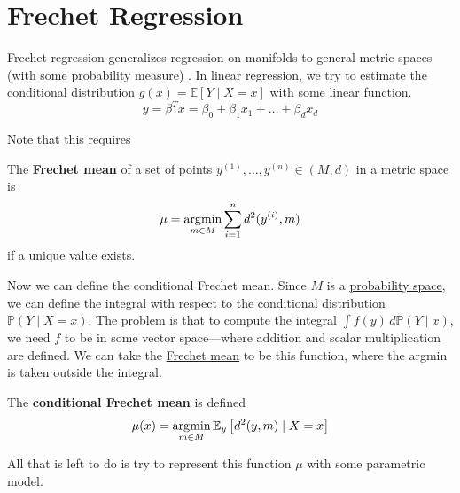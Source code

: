 \section{Frechet Regression} 

  Frechet regression generalizes regression on manifolds to general metric spaces (with some probability measure) \cite{2017petersen}. In linear regression, we try to estimate the conditional distribution $g(x) = \mathbb{E}[Y \mid X = x]$ with some linear function. 
  \begin{equation}
    y = \beta^T x = \beta_0 + \beta_1 x_1 + \ldots + \beta_d x_d
  \end{equation}

  Note that this requires 

  \begin{definition}
    \label{def:frechet-mean}
    The \textbf{Frechet mean} of a set of points $y^{(1)}, \ldots, y^{(n)} \in (M, d)$ in a metric space is 
    \begin{equation}
      \mu = \operatorname*{\arg\!\min}_{m \in M} \sum_{i=1}^n d^2 (y^{(i)}, m)
    \end{equation} 
    if a unique value exists. 
  \end{definition}

  Now we can define the conditional Frechet mean. Since $M$ is a \hyperref[prob-def:probability-space]{probability space}, we can define the integral with respect to the conditional distribution $\mathbb{P}(Y \mid X = x)$. The problem is that to compute the integral $\int f(y) \,d \mathbb{P}(Y \mid x)$, we need $f$ to be in some vector space---where addition and scalar multiplication are defined. We can take the \hyperref[def:frechet-mean]{Frechet mean} to be this function, where the argmin is taken outside the integral. 

  \begin{definition}
    \label{def:conditional-frechet-mean}
    The \textbf{conditional Frechet mean} is defined 
    \begin{equation}
      \mu(x) = \operatorname*{\arg\!\min}_{m \in M} \mathbb{E}_{y} \left[ d^2 (y, m) \mid X = x \right]
    \end{equation}
  \end{definition}

  All that is left to do is try to represent this function $\mu$ with some parametric model. 
